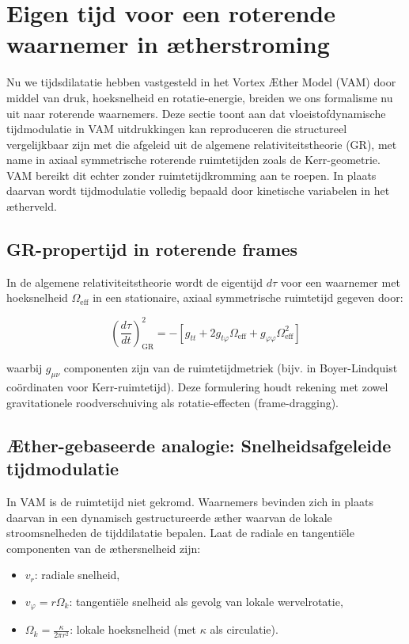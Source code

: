 \section{Eigen tijd voor een roterende waarnemer in ætherstroming}

Nu we tijdsdilatatie hebben vastgesteld in het Vortex Æther Model (VAM) door middel van druk, hoeksnelheid en rotatie-energie, breiden we ons formalisme nu uit naar roterende waarnemers. Deze sectie toont aan dat vloeistofdynamische tijdmodulatie in VAM uitdrukkingen kan reproduceren die structureel vergelijkbaar zijn met die afgeleid uit de algemene relativiteitstheorie (GR), met name in axiaal symmetrische roterende ruimtetijden zoals de Kerr-geometrie. VAM bereikt dit echter zonder ruimtetijdkromming aan te roepen. In plaats daarvan wordt tijdmodulatie volledig bepaald door kinetische variabelen in het ætherveld.

\subsection{GR-propertijd in roterende frames}

In de algemene relativiteitstheorie wordt de eigentijd \(d\tau\) voor een waarnemer met hoeksnelheid \(\Omega_{\text{eff}}\) in een stationaire, axiaal symmetrische ruimtetijd gegeven door:

\begin{equation}
\left( \frac{d\tau}{dt} \right)^2_{\text{GR}} = -\left[ g_{tt} + 2g_{t\varphi} \Omega_{\text{eff}} + g_{\varphi\varphi} \Omega_{\text{eff}}^2 \right]
\label{eq:GR_proper_time}
\end{equation}

waarbij \(g_{\mu\nu}\) componenten zijn van de ruimtetijdmetriek (bijv. in Boyer-Lindquist coördinaten voor Kerr-ruimtetijd). Deze formulering houdt rekening met zowel gravitationele roodverschuiving als rotatie-effecten (frame-dragging).

\subsection{Æther-gebaseerde analogie: Snelheidsafgeleide tijdmodulatie}

In VAM is de ruimtetijd niet gekromd. Waarnemers bevinden zich in plaats daarvan in een dynamisch gestructureerde æther waarvan de lokale stroomsnelheden de tijddilatatie bepalen. Laat de radiale en tangentiële componenten van de æthersnelheid zijn:

\begin{itemize}
\item \(v_r\): radiale snelheid,
\item \(v_\varphi = r\Omega_k\): tangentiële snelheid als gevolg van lokale wervelrotatie,
\item \(\Omega_k = \frac{\kappa}{2\pi r^2}\): lokale hoeksnelheid (met \(\kappa\) als circulatie).
\end{itemize}

